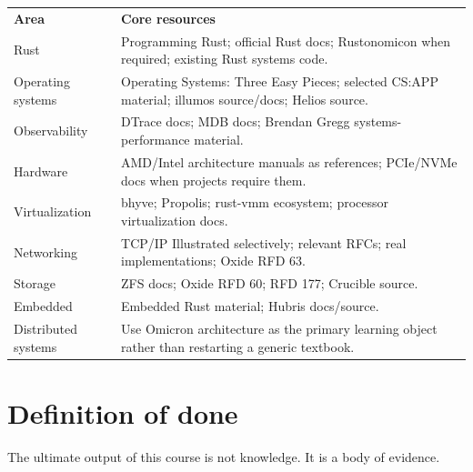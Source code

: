 \documentclass[11pt,letterpaper]{article}
\begin{document}
\begin{center}
\small
\begin{tabular}{>{\raggedright\arraybackslash}p{}>{\raggedright\arraybackslash}p{}}
\textbf{Area} & \textbf{Core resources} \\
Rust & Programming Rust; official Rust docs; Rustonomicon when required; existing Rust systems code. \\
Operating systems & Operating Systems: Three Easy Pieces; selected CS:APP material; illumos source/docs; Helios source. \\
Observability & DTrace docs; MDB docs; Brendan Gregg systems- performance material. \\
Hardware & AMD/Intel architecture manuals as references; PCIe/NVMe docs when projects require them. \\
Virtualization & bhyve; Propolis; rust-vmm ecosystem; processor virtualization docs. \\
Networking & TCP/IP Illustrated selectively; relevant RFCs; real implementations; Oxide RFD 63. \\
Storage & ZFS docs; Oxide RFD 60; RFD 177; Crucible source. \\
Embedded & Embedded Rust material; Hubris docs/source. \\
Distributed systems & Use Omicron architecture as the primary learning object rather than restarting a generic textbook. \\
\end{tabular}
\end{center}

\section{Definition of done}\label{sec:26}

The ultimate output of this course is not knowledge. It is a body of evidence.
\end{document}
